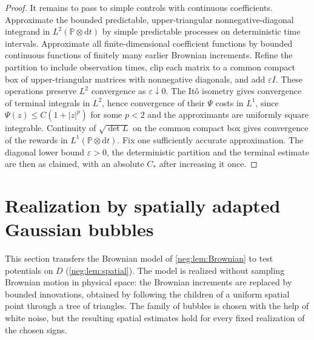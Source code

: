 \documentclass[11pt]{article}
\theoremstyle{definition}
\theoremstyle{remark}
\numberwithin{equation}{section}
\begin{document}
\begin{proof}
It remains to pass to simple controls with continuous coefficients.
Approximate the bounded predictable, upper-triangular
nonnegative-diagonal integrand in $L^2(\mathbb P\otimes\mathrm dt)$ by
simple predictable processes on deterministic time intervals.
Approximate all finite-dimensional coefficient functions by bounded
continuous functions of finitely many earlier Brownian increments.
Refine the partition to include observation times, clip each matrix to
a common compact box of upper-triangular matrices with nonnegative
diagonals, and add $\varepsilon I$. These operations preserve $L^2$
convergence as $\varepsilon\downarrow0$. The It\^o isometry gives
convergence of terminal integrals in $L^2$, hence convergence of their
$\Psi$ costs in $L^1$, since $\Psi(z)\le C(1+|z|^p)$ for some $p<2$ and
the approximants are uniformly square integrable. Continuity of
$\sqrt{\det L}$ on the common compact box gives convergence of the
rewards in $L^1(\mathbb P\otimes\mathrm dt)$. Fix one sufficiently
accurate approximation. The diagonal lower bound $\varepsilon>0$,
the deterministic partition and the terminal estimate are then as
claimed, with an absolute $C_*$ after increasing it once.
\end{proof}

\section{Realization by spatially adapted Gaussian bubbles}
\label{neg:sec:spatial}

This section transfers the Brownian model of \cref{neg:lem:Brownian}
to test potentials on $D$ (\cref{neg:lem:spatial}). The model is
realized without sampling Brownian motion in physical space: the
Brownian increments are replaced by bounded innovations, obtained by
following the children of a uniform spatial point through a tree of
triangles. The family of bubbles is chosen with the help of white
noise, but the resulting spatial estimates hold for every fixed
realization of the chosen signs.
\end{document}
